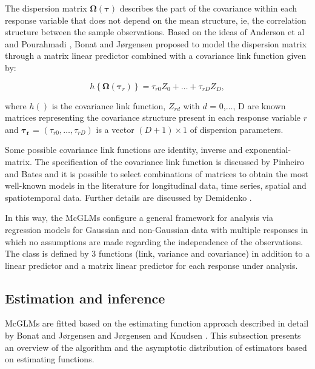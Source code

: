 \documentclass[AMA,STIX1COL]{WileyNJD-v2}
\begin{document}
The dispersion matrix $\boldsymbol{\Omega({\tau})}$ describes the part of the covariance within each response variable that does not depend on the mean structure, ie, the correlation structure between the sample observations. Based on the ideas of Anderson et al \cite{Anderson73} and Pourahmadi \cite{Pourahmadi00}, Bonat and Jørgensen \cite{Bonat16} proposed to model the dispersion matrix through a matrix linear predictor combined with a covariance link function given by:

$$
h\left \{ \boldsymbol{\Omega}(\boldsymbol{\tau}_r) \right \} = \tau_{r0}Z_0 + \ldots + \tau_{rD}Z_D,
$$

\noindent where $h()$ is the covariance link function, $Z_{rd}$ with $d$ = 0,$\ldots$, D are known matrices representing the covariance structure present in each response variable $r$ and $\boldsymbol{\tau_r}$ = $(\tau_{r0}, \ldots, \tau_{rD})$ is a vector $(D + 1) \times 1$ of dispersion parameters.

Some possible covariance link functions are identity, inverse and exponential-matrix. The specification of the covariance link function is discussed by Pinheiro and Bates \cite{Pinheiro96} and it is possible to select combinations of matrices to obtain the most well-known models in the literature for longitudinal data, time series, spatial and spatiotemporal data. Further details are discussed by Demidenko \cite{Demidenko13}.

In this way, the McGLMs configure a general framework for analysis via regression models for Gaussian and non-Gaussian data with multiple responses in which no assumptions are made regarding the independence of the observations. The class is defined by 3 functions (link, variance and covariance) in addition to a linear predictor and a matrix linear predictor for each response under analysis.

\subsection{Estimation and inference}

McGLMs are fitted based on the estimating function approach described in detail by Bonat and Jørgensen \cite{Bonat16} and Jørgensen and Knudsen \cite{jorg04}. This subsection presents an overview of the algorithm and the asymptotic distribution of estimators based on estimating functions.
\end{document}
